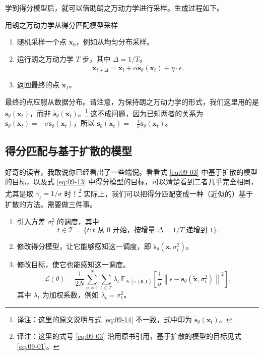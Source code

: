 学到得分模型后，就可以借助朗之万动力学进行采样。生成过程如下。
\begin{booknote}[colframe=blue!65!black,colback=blue!4]{用朗之万动力学从得分匹配模型采样}
  \begin{enumerate}
    \item 随机采样一个点 $\mathbf x_0$，例如从均匀分布采样。
    \item 运行朗之万动力学 $T$ 步，其中 $\Delta=1/T$。
      \begin{equation}
        \mathbf x_{t+\Delta}=\mathbf x_t+\alpha\tilde{\mathbf s}_\theta(\mathbf x_t)+\eta\cdot\epsilon.
        \tag{9.14}\label{eq:09-14}
      \end{equation}
    \item 返回最终的点 $\mathbf x_1$。
  \end{enumerate}
\end{booknote}

最终的点应服从数据分布。请注意，为保持朗之万动力学的形式，我们这里用的是 $\mathbf s_\theta(\mathbf x_t)$，而非 $\tilde{\mathbf s}_\theta(\mathbf x_t)$。\footnote{译注：这里的原文说明与式 \eqref{eq:09-14} 不一致，式中印为 $\tilde{\mathbf s}_\theta(\mathbf x_t)$。} 这不成问题，因为已知两者的关系为 $\tilde{\mathbf s}_\theta(\mathbf x_t)=-\sigma\mathbf s_\theta(\mathbf x_t)$，所以 $\mathbf s_\theta(\mathbf x_t)=-\frac1\sigma\tilde{\mathbf s}_\theta(\mathbf x_t)$。

\subsection{得分匹配与基于扩散的模型}

好奇的读者，我敢说你已经看出了一些端倪。看看式 \eqref{eq:09-03} 中基于扩散的模型的目标，以及式 \eqref{eq:09-13} 中得分模型的目标，可以清楚看到二者几乎完全相同，尤其是取 $\gamma_t=1/\sigma$ 时！\footnote{译注：这里的式号 \eqref{eq:09-03} 沿用原书引用，基于扩散的模型的目标见式 \eqref{eq:09-01}。} 实际上，我们可以把得分匹配变成一种（近似的）基于扩散的方法。需要做三件事。
\begin{enumerate}
  \item 引入方差 $\sigma_t^2$ 的调度，其中
    \[
      t\in\mathcal T=\{t\colon t\text{ 从 }0\text{ 开始，按增量 }\Delta=1/T\text{ 递增到 }1\}.
    \]
  \item 修改得分模型，让它能够感知这一调度，即 $\tilde{\mathbf s}_\theta(\mathbf x,\sigma_t^2)$。
  \item 修改目标，使它也能感知这一调度。
    \begin{equation}
      \mathcal L(\theta)=\frac{1}{2N}\sum_{n=1}^{N}\sum_{t\in\mathcal T}
      \lambda_t\,\mathbb E_{\mathcal N(\epsilon\mid\mathbf 0,\mathbf I)}
      \left[\frac{1}{\sigma}\left\lVert\epsilon-\tilde{\mathbf s}_\theta(\tilde{\mathbf x},\sigma_t^2)\right\rVert^2\right],
      \tag{8}\label{eq:09-original-8}
    \end{equation}
    其中 $\lambda_t$ 为加权系数，例如 $\lambda_t=\sigma_t^2$。
\end{enumerate}

